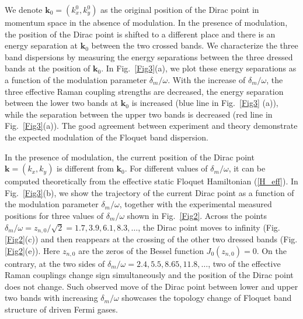 \documentclass[aps,prl,twocolumn,floatfix,reprint]{revtex4}
\begin{document}
We denote $\mathbf{k}_{0}=(k_{x}^{0},k_{y}^{0})$ as the original position of
the Dirac point in momentum space in the absence of modulation. In the
presence of modulation, the position of the Dirac point is shifted to a
different place and there is an energy separation at $\mathbf{k}_{0}$
between the two crossed bands. We characterize the three band dispersions by
measuring the energy separations between the three dressed bands at the
position of $\mathbf{k}_{0}$. In Fig.~\ref{Fig3}(a), we plot these energy
separations as a function of the modulation parameter $\delta _{m}/\omega $.
With the increase of $\delta _{m}/\omega $, the three effective Raman
coupling strengths are decreased, the energy separation between the lower
two bands at $\mathbf{k}_{0}$ is increased (blue line in Fig.~\ref{Fig3}%
(a)), while the separation between the upper two bands is decreased (red
line in Fig.~\ref{Fig3}(a)). The good agreement between experiment and
theory demonstrate the expected modulation of the Floquet band dispersion.

In the presence of modulation, the current position of the Dirac point $%
\mathbf{k=}\left( k_{x},k_{y}\right) $ is different from $\mathbf{k}_{0}$.
For different values of $\delta _{m}/\omega $, it can be computed
theoretically from the effective static Floquet Hamiltonian (\ref{H_eff}).
In Fig.~\ref{Fig3}(b), we show the trajectory of the current Dirac point as
a function of the modulation parameter $\delta _{m}/\omega $, together with
the experimental measured positions for three values of $\delta _{m}/\omega $
shown in Fig.~\ref{Fig2}. Across the points $\delta _{m}/\omega =z_{n,0}/%
\sqrt{2}=1.7,3.9,6.1,8.3,\ldots $, the Dirac point moves to infinity (Fig. %
\ref{Fig2}(c)) and then reappears at the crossing of the other two dressed
bands (Fig. \ref{Fig2}(e)). Here $z_{n,0}$ are the zeros of the Bessel
function $J_{0}(z_{n,0})=0$. On the contrary, at the two sides of $\delta
_{m}/\omega =2.4,5.5,8.65,11.8,\ldots $, two of the effective Raman
couplings change sign simultaneously and the position of the Dirac point
does not change. Such observed move of the Dirac point between lower and
upper two bands with increasing $\delta _{m}/\omega $ showcases the topology
change of Floquet band structure of driven Fermi gases.
\end{document}
